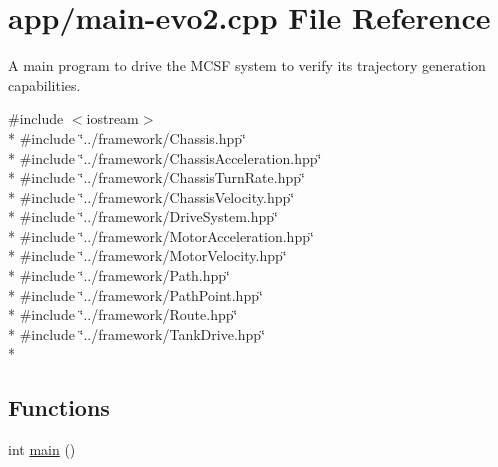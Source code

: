 \hypertarget{main-evo2_8cpp}{\section{app/main-\/evo2.cpp File Reference}
\label{main-evo2_8cpp}
}


A main program to drive the M\-C\-S\-F system to verify its trajectory generation capabilities.  


{\ttfamily \#include $<$iostream$>$}\\*
{\ttfamily \#include \char`\"{}../framework/\-Chassis.\-hpp\char`\"{}}\\*
{\ttfamily \#include \char`\"{}../framework/\-Chassis\-Acceleration.\-hpp\char`\"{}}\\*
{\ttfamily \#include \char`\"{}../framework/\-Chassis\-Turn\-Rate.\-hpp\char`\"{}}\\*
{\ttfamily \#include \char`\"{}../framework/\-Chassis\-Velocity.\-hpp\char`\"{}}\\*
{\ttfamily \#include \char`\"{}../framework/\-Drive\-System.\-hpp\char`\"{}}\\*
{\ttfamily \#include \char`\"{}../framework/\-Motor\-Acceleration.\-hpp\char`\"{}}\\*
{\ttfamily \#include \char`\"{}../framework/\-Motor\-Velocity.\-hpp\char`\"{}}\\*
{\ttfamily \#include \char`\"{}../framework/\-Path.\-hpp\char`\"{}}\\*
{\ttfamily \#include \char`\"{}../framework/\-Path\-Point.\-hpp\char`\"{}}\\*
{\ttfamily \#include \char`\"{}../framework/\-Route.\-hpp\char`\"{}}\\*
{\ttfamily \#include \char`\"{}../framework/\-Tank\-Drive.\-hpp\char`\"{}}\\*
\subsection*{Functions}
\begin{DoxyCompactItemize}
\item 
int \hyperlink{main-evo2_8cpp_ae66f6b31b5ad750f1fe042a706a4e3d4}{main} ()
\end{DoxyCompactItemize}


